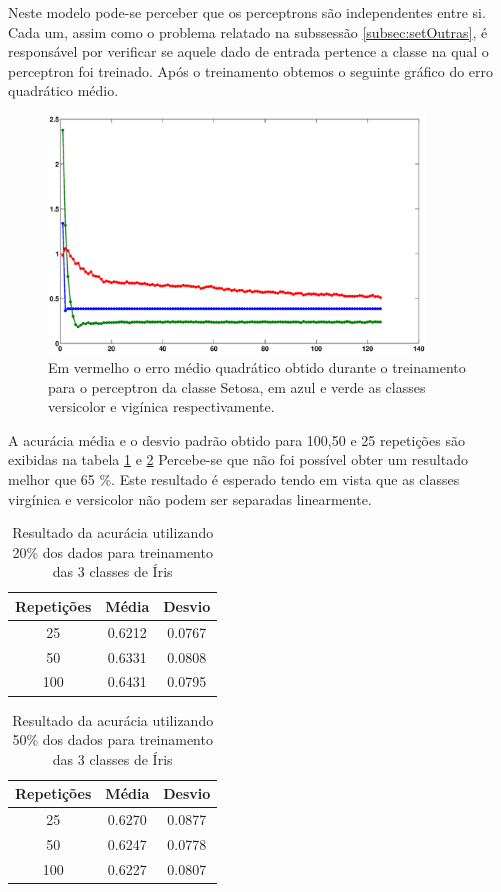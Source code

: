 \documentclass[12pt,journal,onecolumn]{IEEEtran}
\begin{document}
Neste modelo pode-se perceber que os perceptrons são independentes entre si.
Cada um, assim como o problema relatado na subssessão \ref{subsec:setOutras}, é
responsável por verificar se aquele dado de entrada pertence a classe na qual o
perceptron foi treinado. Após o treinamento obtemos o seguinte gráfico do erro
quadrático médio.


\begin{figure}[!htbp]
	\centering
	\includegraphics[width=10cm]
	{eps/3classes/erro.eps}
	\caption{Em vermelho o erro médio quadrático obtido durante o treinamento
	para o perceptron da classe Setosa, em azul e verde as classes versicolor e
	vigínica respectivamente.}
	\label{fig:erromlp} 
\end{figure} 



A acurácia média e o desvio padrão obtido para 100,50 e 25 repetições são
exibidas na tabela \ref{tab:acurr3}  e \ref{tab:acurr32} Percebe-se que não foi
possível obter um resultado melhor que 65 \%. Este resultado é esperado tendo em
vista que as classes virgínica e versicolor não podem ser separadas linearmente.


\begin{table}[!htbp]  
\caption{Resultado da acurácia utilizando 20\%
				 dos dados para treinamento das 3 classes de Íris}
\label{tab:acurr3}
\centering
	\begin{tabular}{| c | c | c |}
		\hline
		 Repetições & Média & Desvio \\ \hline
		 25      & 0.6212   & 0.0767 \\ \hline
		 50      & 0.6331   & 0.0808 \\ \hline
		 100 	 & 0.6431   & 0.0795 \\ 
		\hline
	\end{tabular}
\end{table}


\begin{table}[!htbp]  
\caption{Resultado da acurácia utilizando 50\%
				 dos dados para treinamento das 3 classes de Íris}						 
\label{tab:acurr32}
\centering
	\begin{tabular}{| c | c | c |}
		\hline
		 Repetições & Média & Desvio \\ \hline
		 25      & 0.6270   & 0.0877 \\ \hline
		 50      & 0.6247   & 0.0778 \\ \hline
		 100 	 & 0.6227   & 0.0807 \\ 
		\hline
	\end{tabular}
\end{table}
\end{document}
